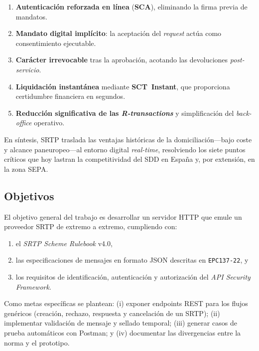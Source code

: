 \begin{enumerate}[label=\alph*)]
  \item \textbf{Autenticación reforzada en línea} (\textbf{SCA}), eliminando la firma previa de mandatos.
  \item \textbf{Mandato digital implícito}: la aceptación del \textit{request} actúa como consentimiento ejecutable.
  \item \textbf{Carácter irrevocable} tras la aprobación, acotando las devoluciones \emph{post-servicio}.
  \item \textbf{Liquidación instantánea} mediante \textbf{SCT~Instant}, que proporciona certidumbre financiera en segundos.
  \item \textbf{Reducción significativa de las \emph{R-transactions}} y simplificación del \emph{back-office} operativo.
\end{enumerate}

En síntesis, SRTP traslada las ventajas históricas de la domiciliación—bajo coste y alcance paneuropeo—al entorno digital \emph{real-time}, resolviendo los siete puntos críticos que hoy lastran la competitividad del SDD en España y, por extensión, en la zona SEPA.

\subsection{Objetivos}
\label{subsec:Objetivos}
El objetivo general del trabajo es desarrollar un servidor HTTP que emule un proveedor SRTP de extremo a extremo, cumpliendo con:
\begin{enumerate}
  \item el \emph{SRTP Scheme Rulebook} v4.0,
  \item las especificaciones de mensajes en formato JSON descritas en \texttt{EPC137-22}, y
  \item los requisitos de identificación, autenticación y autorización del \emph{API Security Framework}.
\end{enumerate}
Como metas específicas se plantean: (i) exponer endpoints REST para los flujos genéricos (creación, rechazo, respuesta y cancelación de un SRTP); (ii) implementar validación de mensaje y sellado temporal; (iii) generar casos de prueba automáticos con Postman; y (iv) documentar las divergencias entre la norma y el prototipo.

